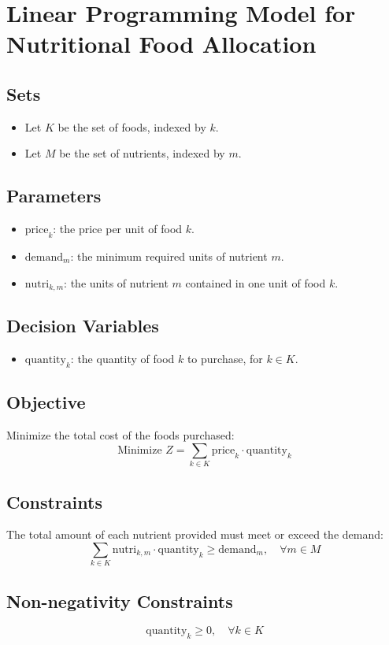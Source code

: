 \documentclass{article}
\begin{document}
\section*{Linear Programming Model for Nutritional Food Allocation}

\subsection*{Sets}
\begin{itemize}
    \item Let \( K \) be the set of foods, indexed by \( k \).
    \item Let \( M \) be the set of nutrients, indexed by \( m \).
\end{itemize}

\subsection*{Parameters}
\begin{itemize}
    \item \( \text{price}_{k} \): the price per unit of food \( k \).
    \item \( \text{demand}_{m} \): the minimum required units of nutrient \( m \).
    \item \( \text{nutri}_{k, m} \): the units of nutrient \( m \) contained in one unit of food \( k \).
\end{itemize}

\subsection*{Decision Variables}
\begin{itemize}
    \item \( \text{quantity}_{k} \): the quantity of food \( k \) to purchase, for \( k \in K \).
\end{itemize}

\subsection*{Objective}
Minimize the total cost of the foods purchased:
\[
\text{Minimize } Z = \sum_{k \in K} \text{price}_{k} \cdot \text{quantity}_{k}
\]

\subsection*{Constraints}
The total amount of each nutrient provided must meet or exceed the demand:
\[
\sum_{k \in K} \text{nutri}_{k, m} \cdot \text{quantity}_{k} \geq \text{demand}_{m}, \quad \forall m \in M
\]

\subsection*{Non-negativity Constraints}
\[
\text{quantity}_{k} \geq 0, \quad \forall k \in K
\]
\end{document}
